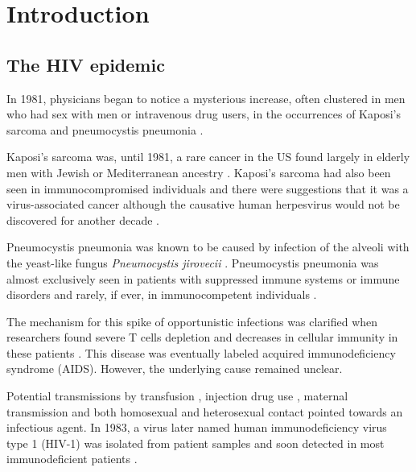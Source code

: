 \documentclass[../sherrill-Mix_thesis.tex]{subfiles}
\begin{document}
\graphicspath{{im/}{intro/im/}}
\chapter{Introduction}
\section{The HIV epidemic}
	In 1981, physicians began to notice a mysterious increase, often clustered in men who had sex with men or intravenous drug users, in the occurrences of Kaposi's sarcoma and pneumocystis pneumonia \citep{Gottlieb1981,Friedman-Kien1981,Hymes1981,Masur1981,Siegal1981,Gottlieb1981a}. 
	
	Kaposi's sarcoma was, until 1981, a rare cancer in the US found largely in elderly men with Jewish or Mediterranean ancestry \citep{Laor1979}. Kaposi's sarcoma had also been seen in immunocompromised individuals \citep{Klein1974,Myers1974,Kapadia1977} and there were suggestions that it was a virus-associated cancer \citep{Safai1981} although the causative human herpesvirus would not be discovered for another decade \citep{Chang1994,Sitas1999}. 
	
	Pneumocystis pneumonia was known to be caused by infection of the alveoli with the yeast-like fungus \emph{Pneumocystis jirovecii} \citep{Burke1973,Hughes1977}. Pneumocystis pneumonia was almost exclusively seen in patients with suppressed immune systems or immune disorders and rarely, if ever, in immunocompetent individuals \citep{Hughes1977}. %

	The mechanism for this spike of opportunistic infections was clarified when researchers found severe T cells depletion and decreases in cellular immunity in these patients \citep{Masur1981,Siegal1981,Gottlieb1981a,Gerstoft1982,Masur1982}. This disease was eventually labeled acquired immunodeficiency syndrome (AIDS). However, the underlying cause remained unclear. 
	
	Potential transmissions by transfusion \citep{Ammann1982,Ehrenkranz1982,Poon1982}, injection drug use \citep{Masur1981,Masur1982,Greene1982}, maternal transmission \citep{OReilly1982} and both homosexual \citep{Fannin1982,Gerstoft1982} and heterosexual \citep{Masur1982,Harris1983} contact pointed towards an infectious agent. In 1983, a virus later named human immunodeficiency virus type 1 (HIV-1) was isolated from patient samples \citep{Barre-Sinoussi1983,Gallo1983,Popovic1984,Levy1984} and soon detected in most immunodeficient patients \citep{Gallo1984,Sarngadharan1984,Safai1984,Levy1984}. 
\end{document}
